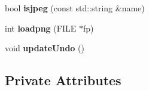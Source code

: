 \begin{DoxyCompactItemize}
\item 
bool {\bfseries isjpeg} (const std\+::string \&name)\hypertarget{classMIAApp_aca628e45e29bc68fa7a9829d4bf9ce43}{}\label{classMIAApp_aca628e45e29bc68fa7a9829d4bf9ce43}

\item 
int {\bfseries loadpng} (F\+I\+LE $\ast$fp)\hypertarget{classMIAApp_a14dde1e19c341b5558f9c80150f24138}{}\label{classMIAApp_a14dde1e19c341b5558f9c80150f24138}

\item 
void {\bfseries update\+Undo} ()\hypertarget{classMIAApp_a730fc463e33ece951f353f6a746b5317}{}\label{classMIAApp_a730fc463e33ece951f353f6a746b5317}

\end{DoxyCompactItemize}
\subsection*{Private Attributes}
